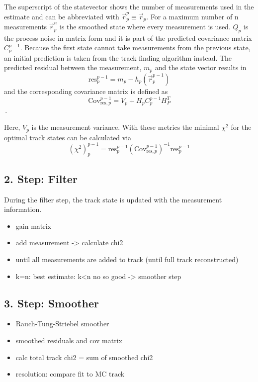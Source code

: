 The superscript of the statevector shows the number of measurements used in the estimate and can be abbreviated with $\vec{r}_p^p \equiv \vec{r}_p$. For a maximum number of n measurements $\vec{r}_p^n$ is the smoothed state where every measurement is used.
$Q_p$ is the process noise in matrix form and it is part of the predicted covariance matrix $C_p^{p-1}$.
Because the first state cannot take measurements from the previous state, an initial prediction is taken from the track finding algorithm instead.
The predicted residual between the measurement, $m_p$ and the state vector results in
\begin{equation}
  \text{res}_p^{p-1} = m_p - h_p\left( \vec{r}_p^{p-1} \right)
\end{equation}
and the corresponding covariance matrix is defined as
\begin{equation}
  \text{Cov}_{\text{res},p}^{p-1} = V_p + H_p C_p^{p-1} H_P^T
\end{equation}\,.

Here, $V_p$ is the measurement variance. With these metrics the minimal $\chi^2$ for the optimal track states can be calculated via
\begin{equation}
  \left( \chi^2 \right)_p^{p-1} = \text{res}_p^{p-1} \left(\text{Cov}_{\text{res},p}^{p-1}\right)^{-1} \text{res}_p^{p-1}
\end{equation}

\subsection{2. Step: Filter}
During the filter step, the track state is updated with the measurement information.
\begin{itemize}
  \item gain matrix
  \item add measurement -> calculate chi2
  \item until all measurements are added to track (until full track reconstructed)
  \item k=n: best estimate: k<n no so good -> smoother step
\end{itemize}

\subsection{3. Step: Smoother}
\begin{itemize}
  \item Rauch-Tung-Striebel smoother
  \item smoothed residuals and cov matrix
  \item calc total track chi2 = sum of smoothed chi2
  \item resolution: compare fit to MC track
\end{itemize}

